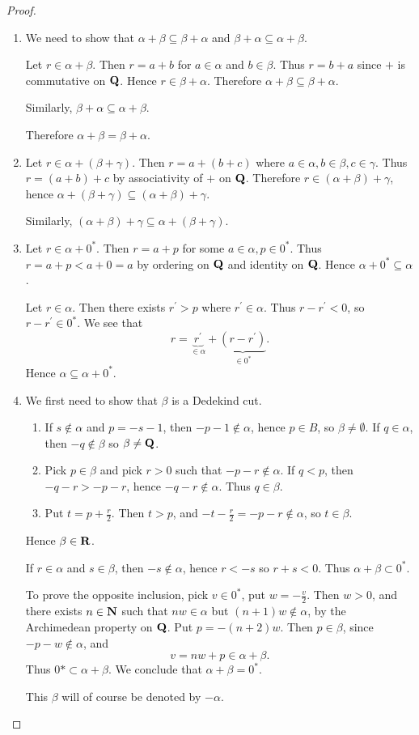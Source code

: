 \begin{proof} \
\begin{enumerate}[label=(\arabic*)]
\item We need to show that $\alpha+\beta\subseteq\beta+\alpha$ and $\beta+\alpha\subseteq\alpha+\beta$.

Let $r\in\alpha+\beta$. Then $r=a+b$ for $a\in\alpha$ and $b\in\beta$. Thus $r=b+a$ since $+$ is commutative on $\mathbf Q$. Hence $r\in\beta+\alpha$. Therefore $\alpha+\beta\subseteq\beta+\alpha$.

Similarly, $\beta+\alpha\subseteq\alpha+\beta$.

Therefore $\alpha+\beta=\beta+\alpha$.

\item Let $r\in\alpha+(\beta+\gamma)$. Then $r=a+(b+c)$ where $a\in\alpha,b\in\beta,c\in\gamma$. Thus $r=(a+b)+c$ by associativity of $+$ on $\mathbf Q$. Therefore $r\in(\alpha+\beta)+\gamma$, hence $\alpha+(\beta+\gamma)\subseteq(\alpha+\beta)+\gamma$.

Similarly, $(\alpha+\beta)+\gamma\subseteq\alpha+(\beta+\gamma)$.

\item Let $r\in\alpha+0^*$. Then $r=a+p$ for some $a\in\alpha,p\in0^*$. Thus $r=a+p<a+0=a$ by ordering on $\mathbf Q$ and identity on $\mathbf Q$. Hence $\alpha+0^*\subseteq\alpha$.

Let $r\in\alpha$. Then there exists $r^\prime>p$ where $r^\prime\in\alpha$. Thus $r-r^\prime<0$, so $r-r^\prime\in0^*$. We see that
\[ r=\underbrace{r^\prime}_{\in\alpha}+\underbrace{(r-r^\prime)}_{\in0^*}. \]
Hence $\alpha\subseteq\alpha+0^*$.

\item We first need to show that $\beta$ is a Dedekind cut.
\begin{enumerate}[label=(\roman*)]
\item If $s\notin\alpha$ and $p=-s-1$, then $-p-1\notin\alpha$, hence $p\in B$, so $\beta\neq\emptyset$. If $q\in\alpha$, then $-q\notin\beta$ so $\beta\neq\mathbf Q$.
\item Pick $p\in\beta$ and pick $r>0$ such that $-p-r\notin\alpha$. If $q<p$, then $-q-r>-p-r$, hence $-q-r\notin\alpha$. Thus $q\in\beta$.
\item Put $t=p+\frac{r}{2}$. Then $t>p$, and $-t-\frac{r}{2}=-p-r\notin\alpha$, so $t\in\beta$.
\end{enumerate}
Hence $\beta\in\mathbf R$.

If $r\in\alpha$ and $s\in\beta$, then $-s\notin\alpha$, hence $r<-s$ so $r+s<0$. Thus $\alpha+\beta\subset0^*$.

To prove the opposite inclusion, pick $v\in0^*$, put $w=-\frac{v}{2}$. Then $w>0$, and there exists $n\in\mathbf N$ such that $nw\in\alpha$ but $(n+1)w\notin\alpha$, by the Archimedean property on $\mathbf Q$. Put $p=-(n+2)w$. Then $p\in\beta$, since $-p-w\notin\alpha$, and
\[v=nw+p\in\alpha+\beta.\]
Thus $0*\subset\alpha+\beta$. We conclude that $\alpha+\beta=0^*$.

This $\beta$ will of course be denoted by $-\alpha$.
\end{enumerate}
\end{proof}

